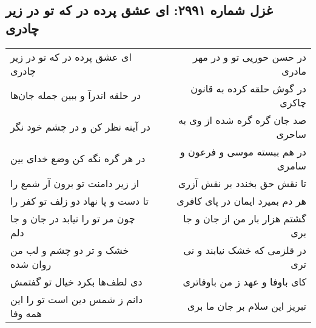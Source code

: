 \begin{center}
\section*{غزل شماره ۲۹۹۱: ای عشق پرده در که تو در زیر چادری}
\label{sec:2991}
\begin{longtable}{l p{0.5cm} r}
ای عشق پرده در که تو در زیر چادری
&&
در حسن حوریی تو و در مهر مادری
\\
در حلقه اندرآ و ببین جمله جان‌ها
&&
در گوش حلقه کرده به قانون چاکری
\\
در آینه نظر کن و در چشم خود نگر
&&
صد جان گره گره شده از وی به ساحری
\\
در هر گره نگه کن وضع خدای بین
&&
در هم ببسته موسی و فرعون و سامری
\\
از زیر دامنت تو برون آر شمع را
&&
تا نقش حق بخندد بر نقش آزری
\\
تا دست و پا نهاد دو زلف تو کفر را
&&
هر دم بمیرد ایمان در پای کافری
\\
چون مر تو را نیابد در جان و جا دلم
&&
گشتم هزار بار من از جان و جا بری
\\
خشک و تر دو چشم و لب من روان شده
&&
در قلزمی که خشک نیابند و نی تری
\\
دی لطف‌ها بکرد خیال تو گفتمش
&&
کای باوفا و عهد ز من باوفاتری
\\
دانم ز شمس دین است تو را این همه وفا
&&
تبریز این سلام بر جان ما بری
\\
\end{longtable}
\end{center}
